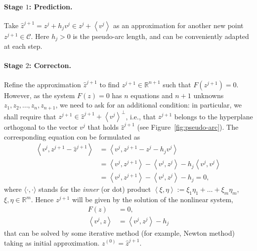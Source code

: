 \documentclass[11pt,reqno,twoside]{article}
\newcommand{\R}{\ensuremath{\mathbb{R}}}
\theoremstyle{remark}
\begin{document}
  \paragraph{Stage $1$: Prediction.}
    Take $\hat{z}^{j+1} = z^{j} + h_{j}
    v^{j}\in z^{j} + \left\langle v^{j}\right\rangle$ as an approximation
    for another new point $z^{j+1}\in\mathcal{C}$. Here $h_{j} > 0$ is the
    pseudo-arc length, and can be conveniently adapted at each step.
  \paragraph{Stage $2$: Correcton.}
 Refine the approximation $\hat{z}^{j+1}$ to
    find $z^{j+1}\in\R^{n+1}$ such that $F\left(z^{j+1}\right) = 0$.
    However, as the system $F(z) = 0$ has $n$ equations and $n+1$ unknowns
    $z_{1}, z_{2},\dots,z_{n},z_{n+1}$, we need to ask for an additional
    condition: in particular, we shall require that
    $z^{j+1}\in\hat{z}^{j+1} +\left\langle v^{j}\right\rangle^{\perp}$, i.e., that
    $z^{j+1}$ belongs to
    the hyperplane orthogonal to the vector $v^{j}$ that holds
    $\hat{z}^{j+1}$
    (see Figure~\ref{fig:pseudo-arc}). The
    corresponding equation con be formulated as
    \begin{align*}
      \left\langle v^{j}, z^{j+1} - \hat{z}^{j+1}\right\rangle &=
      \left\langle v^{j}, z^{j+1} - z^{j} - h_{j} v^{j}\right\rangle \\
      &= \left\langle v^{j}, z^{j+1}\right\rangle -
        \left\langle v^{j}, z^{j}\right\rangle -
        h_{j} \left\langle v^{j}, v^{j}\right\rangle\\
      &=  \left\langle v^{j}, z^{j+1}\right\rangle -
          \left\langle v^{j}, z^{j}\right\rangle - h_{j} = 0,
    \end{align*}
    where $\langle\cdot, \cdot\rangle$ stands for the \emph{inner} (or dot)
    product $\left\langle\xi, \eta\right\rangle := \xi_{1}\eta_{1} + \dots +
    \xi_{m}\eta_{m}$, $\xi, \eta\in\R^{m}$. Hence $z^{j+1}$ will be
    given by the solution of the nonlinear system,
    \begin{displaymath}
      \begin{split}%
        F(z) &= 0,\\
        \left\langle v^{j}, z\right\rangle &= \left\langle v^{j},
        z^{j}\right\rangle - h_{j}
        \end{split}
    \end{displaymath}
    that can be solved by some iterative method (for example, Newton
    method) taking as initial approximation. $z^{(0)} = \hat{z}^{j+1}$.
\end{document}
